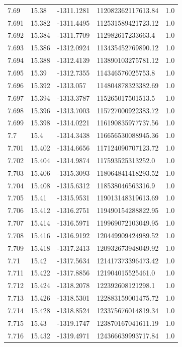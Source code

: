 \begin{tabular}{lllll}
7.69 & 15.38 & -1311.1281 & 112082362117613.84 & 1.0 \\
7.691 & 15.382 & -1311.4495 & 112531589421723.12 & 1.0 \\
7.692 & 15.384 & -1311.7709 & 112982617233663.4 & 1.0 \\
7.693 & 15.386 & -1312.0924 & 113435452769890.12 & 1.0 \\
7.694 & 15.388 & -1312.4139 & 113890103275781.12 & 1.0 \\
7.695 & 15.39 & -1312.7355 & 114346576025753.8 & 1.0 \\
7.696 & 15.392 & -1313.057 & 114804878323382.69 & 1.0 \\
7.697 & 15.394 & -1313.3787 & 115265017501513.5 & 1.0 \\
7.698 & 15.396 & -1313.7003 & 115727000922383.72 & 1.0 \\
7.699 & 15.398 & -1314.0221 & 116190835977737.56 & 1.0 \\
7.7 & 15.4 & -1314.3438 & 116656530088945.36 & 1.0 \\
7.701 & 15.402 & -1314.6656 & 117124090707123.72 & 1.0 \\
7.702 & 15.404 & -1314.9874 & 117593525313252.0 & 1.0 \\
7.703 & 15.406 & -1315.3093 & 118064841418293.52 & 1.0 \\
7.704 & 15.408 & -1315.6312 & 118538046563316.9 & 1.0 \\
7.705 & 15.41 & -1315.9531 & 119013148319613.69 & 1.0 \\
7.706 & 15.412 & -1316.2751 & 119490154288822.95 & 1.0 \\
7.707 & 15.414 & -1316.5971 & 119969072103049.95 & 1.0 \\
7.708 & 15.416 & -1316.9192 & 120449909424989.52 & 1.0 \\
7.709 & 15.418 & -1317.2413 & 120932673948049.92 & 1.0 \\
7.71 & 15.42 & -1317.5634 & 121417373396473.42 & 1.0 \\
7.711 & 15.422 & -1317.8856 & 121904015525461.0 & 1.0 \\
7.712 & 15.424 & -1318.2078 & 122392608121298.1 & 1.0 \\
7.713 & 15.426 & -1318.5301 & 122883159001475.72 & 1.0 \\
7.714 & 15.428 & -1318.8524 & 123375676014819.34 & 1.0 \\
7.715 & 15.43 & -1319.1747 & 123870167041611.19 & 1.0 \\
7.716 & 15.432 & -1319.4971 & 124366639993717.84 & 1.0 \\

\end{tabular}
